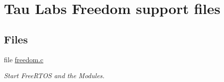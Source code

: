 \hypertarget{group___freedom}{\section{\-Tau \-Labs \-Freedom support files}
\label{group___freedom}
}
\subsection*{\-Files}
\begin{DoxyCompactItemize}
\item 
file \hyperlink{freedom_8c}{freedom.\-c}
\begin{DoxyCompactList}\small\item\em \-Start \-Free\-R\-T\-O\-S and the \-Modules. \end{DoxyCompactList}\end{DoxyCompactItemize}
